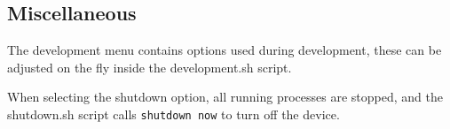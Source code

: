 \subsection{Miscellaneous}
The development menu contains options used during development, these can be adjusted on the fly inside the development.sh script.

When selecting the shutdown option, all running processes are stopped, and the shutdown.sh script calls \lstinline[style=inline]|shutdown now| to turn off the device.



